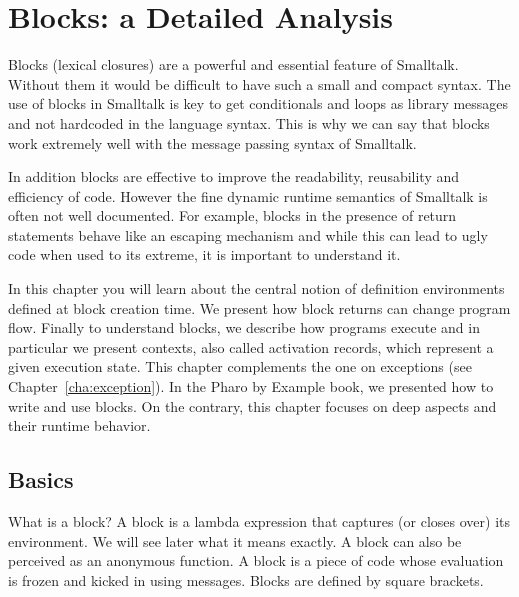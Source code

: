 \documentclass[a4paper,10pt,twoside]{book}
\begin{document}
\fi
\sloppy
\chapter{Blocks: a Detailed Analysis}


Blocks (lexical closures) are a powerful and essential feature of Smalltalk. Without them it
would be difficult to have such a small and compact syntax. The use of blocks in Smalltalk
is key to get conditionals and loops as library messages and not hardcoded in the language syntax. This is why we can say that
blocks work extremely well with the message passing syntax of Smalltalk.

In addition blocks are  effective to improve the readability, reusability and efficiency of code. However the fine dynamic runtime semantics of Smalltalk is often not well documented. For example, blocks in the presence of return statements behave like an escaping mechanism and while this can lead to ugly code when used to its extreme, it is important to understand it. 

In this chapter you will learn about the central notion of definition environments defined at block creation time. We present how block returns can change program flow. Finally to understand blocks, we describe how programs execute and in particular we present contexts, also called activation records, which represent a given execution state.
This chapter complements the one on exceptions (see Chapter~\ref{cha:exception}). In the Pharo by Example book, we presented how to write and use blocks. On the contrary, this chapter focuses on deep aspects and their runtime behavior.

\section{Basics}

What is a block? A block is a lambda expression that captures (or closes over) its environment. We will see later what it means exactly. A block can also be perceived as an anonymous function. A block is a piece of code whose evaluation is frozen and kicked in using messages. Blocks are defined by square brackets.
\end{document}
